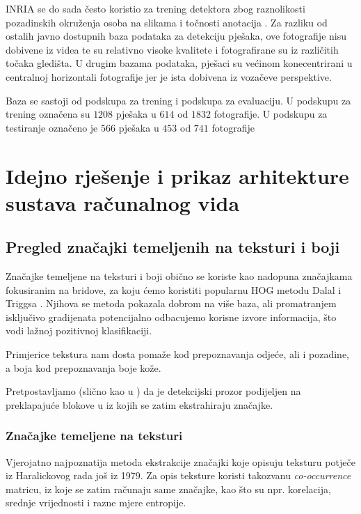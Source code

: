 \documentclass[seminar]{fer}
\begin{document}
INRIA se do sada često koristio za trening detektora zbog raznolikosti pozadinskih okruženja osoba na slikama i točnosti anotacija \cite{BenensonOHS14}. Za razliku od ostalih javno dostupnih baza podataka za detekciju pješaka, ove fotografije nisu dobivene iz videa te su relativno visoke kvalitete i fotografirane su iz različitih točaka gledišta. U drugim bazama podataka, pješaci su većinom konecentrirani u centralnoj horizontali fotografije jer je ista dobivena iz vozačeve perspektive.

Baza se sastoji od podskupa za trening i podskupa za evaluaciju. U podskupu za trening označena su $1208$ pješaka u $614$ od $1832$ fotografije. U podskupu za testiranje označeno je $566$ pješaka u $453$ od $741$ fotografije \cite{Dollar:2012:PDE:2197081.2197275}

\chapter{Idejno rješenje i prikaz arhitekture sustava računalnog vida}

\section{Pregled značajki temeljenih na teksturi i boji}

Značajke temeljene na teksturi i boji obično se koriste kao nadopuna značajkama fokusiranim na bridove, za koju ćemo koristiti popularnu HOG
metodu Dalal i Triggsa \cite{HOG}. Njihova se metoda pokazala dobrom na više baza, ali promatranjem isključivo gradijenata potencijalno odbacujemo
korisne izvore informacija, što vodi lažnoj pozitivnoj klasifikaciji.

Primjerice tekstura nam dosta pomaže kod prepoznavanja odjeće, ali i pozadine, a boja kod prepoznavanja boje kože.


Pretpostavljamo (slično kao u \cite{Schwartz}) da je detekcijski prozor podijeljen na preklapajuće blokove u iz kojih se zatim ekstrahiraju značajke.

\subsection{Značajke temeljene na teksturi}

Vjerojatno najpoznatija metoda ekstrakcije značajki koje opisuju teksturu potječe iz Haralickovog rada \cite{Haralick} još iz 1979. Za opis teksture koristi takozvanu \emph{co-occurrence} matricu, iz koje se zatim računaju same značajke, kao što su npr. korelacija, srednje vrijednosti i razne mjere entropije.
\end{document}
